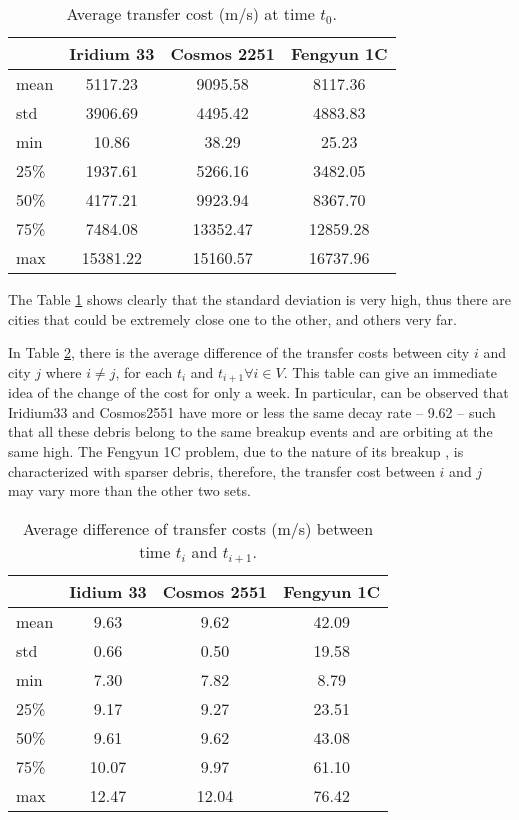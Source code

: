 \documentclass[a4paper,9pt,journal,twoside,compsoc]{PPIEEEtran}
\begin{document}
\begin{table}[h!]
\centering
\caption{Average transfer cost (m/s) at time $t_0$.}
\begin{tabular}{| l | c | c | c |}
\hline
     & \textbf{Iridium 33} & \textbf{Cosmos 2251} & \textbf{Fengyun 1C} \\ \hline
     mean & 5117.23  & 9095.58  & 8117.36  \\ \hline
     std  & 3906.69  & 4495.42  & 4883.83  \\ \hline
     min  & 10.86    & 38.29    & 25.23    \\ \hline
     25\% & 1937.61  & 5266.16  & 3482.05  \\ \hline
     50\% & 4177.21  & 9923.94  & 8367.70  \\ \hline
     75\% & 7484.08  & 13352.47 & 12859.28 \\ \hline
     max  & 15381.22 & 15160.57 & 16737.96 \\ \hline
\end{tabular}
\label{tab:avgtransfcost}
\end{table}

The Table \ref{tab:avgtransfcost} shows clearly that the standard deviation is very high, thus there are cities that could be extremely close one to the other, and others very far. 

In Table \ref{tab:avgdifftransfcost}, there is the average difference of the transfer costs between city $i$ and city $j$ where $i \neq j$, for each $t_i$ and $t_{i+1} \forall i \in V$. This table can give an immediate idea of the change of the cost for only a week. In particular, can be observed that Iridium33 and Cosmos2551 have more or less the same decay rate -- 9.62 -- such that all these debris belong to the same breakup events and are orbiting at the same high. The Fengyun 1C problem, due to the nature of its breakup \cite{nasahistory}, is characterized with sparser debris, therefore, the transfer cost between $i$ and $j$ may vary more than the other two sets.

\begin{table}[h]
\centering
\caption{Average difference of transfer costs (m/s) between time $t_i$ and $t_{i+1}$.}
\begin{tabular}{| l | c | c | c |}
\hline
 & \textbf{Iidium 33} & \textbf{Cosmos 2551} & \textbf{Fengyun 1C} \\ \hline
     mean & 9.63 & 9.62 & 42.09 \\ \hline
     std & 0.66 & 0.50 & 19.58 \\ \hline
     min & 7.30 & 7.82 & 8.79 \\ \hline
     25\% & 9.17 & 9.27 & 23.51 \\ \hline
     50\% & 9.61 & 9.62 & 43.08 \\ \hline
     75\% & 10.07 & 9.97 & 61.10 \\ \hline
     max & 12.47 & 12.04 & 76.42 \\ \hline
\end{tabular}
\label{tab:avgdifftransfcost}
\end{table}
\end{document}
